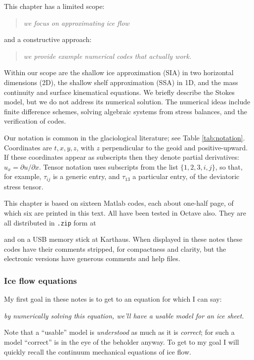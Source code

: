 \documentclass[titlepage,letterpaper,final,12pt]{scrartcl}
\begin{document}
This chapter has a limited scope:
  \begin{quote}\emph{we focus on approximating ice flow}\end{quote}
and a constructive approach:
  \begin{quote}\emph{we provide example numerical codes that actually work.}\end{quote}
Within our scope are the shallow ice approximation (SIA) in two horizontal dimensions (2D), the shallow shelf approximation (SSA) in 1D, and the mass continuity and surface kinematical equations.  We briefly describe the Stokes model, but we do not address its numerical solution.  The numerical ideas include finite difference schemes, solving algebraic systems from stress balances, and the verification of codes.

Our notation is common in the glaciological literature; see Table \ref{tab:notation}.  Coordinates are $t,x,y,z$, with $z$ perpendicular to the geoid and positive-upward.  If these coordinates appear as subscripts then they denote partial derivatives: $u_x = \partial u/\partial x$.  Tensor notation uses subscripts from the list $\{1,2,3,i,j\}$, so that, for example, $\tau_{ij}$ is a generic entry, and $\tau_{13}$ a particular entry, of the deviatoric stress tensor.

This chapter is based on sixteen Matlab codes, each about one-half page, of which six are printed in this text.  All have been tested in Octave also.  They are all distributed in \texttt{.zip} form at
\begin{quote}
\end{quote}
\noindent and on a USB memory stick at Karthaus.  When displayed in these notes these codes have their comments stripped, for compactness and clarity, but the electronic versions have generous comments and help files.

\subsubsection*{Ice flow equations}  My first goal in these notes is to get to an equation for which I can say:
\begin{center}
\emph{by numerically solving this equation, we'll have a usable model for an ice sheet.}
\end{center}
Note that a ``usable'' model is \emph{understood} as much as it is \emph{correct}; for such a model ``correct'' is in the eye of the beholder anyway.  To get to my goal I will quickly recall the continuum mechanical equations of ice flow.  
\end{document}
